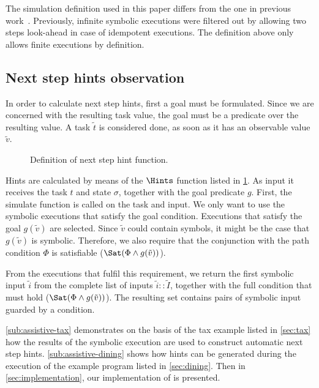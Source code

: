 The simulation definition used in this paper differs from the one in previous work~\cite{Naus2019}.
Previously, infinite symbolic executions were filtered out by allowing two steps look-ahead in case of idempotent executions.
The definition above only allows finite executions by definition.



\subsection{Next step hints observation}
\label{sub:hints}


In order to calculate next step hints, first a goal must be formulated.
Since we are concerned with the resulting task value, the goal must be a predicate over the resulting value.
A task $\tilde{t}$ is considered done, as soon as it has an observable value $\tilde{v}$.

\begin{figure}
  \caption{Definition of next step hint function.}
  \label{fig:hints}
\end{figure}


Hints are calculated by means of the $\Hints$ function listed in \cref{fig:hints}.
As input it receives the task $t$ and state $\sigma$, together with the goal predicate $g$.
First, the simulate function is called on the task and input.
We only want to use the symbolic executions that satisfy the goal condition.
Executions that satisfy the goal $g(\tilde{v})$ are selected.
Since $\tilde{v}$ could contain symbols, it might be the case that $g(\tilde{v})$ is symbolic.
Therefore, we also require that the conjunction with the path condition $\Phi$ is satisfiable ($\Sat(\Phi\land g(\tilde{v}))$).

From the executions that fulfil this requirement, we return the first symbolic input $\tilde{i}$ from the complete list of inputs $\tilde{i}::\tilde{I}$,
together with the full condition that must hold ($\Sat(\Phi\land g(\tilde{v}))$).
The resulting set contains pairs of symbolic input guarded by a condition.

\cref{sub:assistive-tax} demonstrates on the basis of the tax example listed in \cref{sec:tax} how the results of the symbolic execution are used to construct automatic next step hints.
\cref{sub:assistive-dining} shows how hints can be generated during the execution of the example \TOPHAT program listed in \cref{sec:dining}.
Then in \cref{sec:implementation}, our implementation of \ASTOPHAT is presented.



